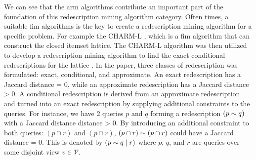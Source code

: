 We can see that the \acl{arm} algorithms contribute an important part of the foundation of this redescription mining algorithm category.
Often times, a suitable \ac{fim} algorithms is the key to create a redescription mining algorithm for a specific problem.
For example the CHARM-L \citep{zakihsiao2005}, which is a \ac{fim} algorithm that can construct the closed itemset lattice.
The CHARM-L algorithm was then utilized to develop a redescription mining algorithm to find the exact conditional redescriptions for the lattice .
In the paper, three classes of redescription was formulated: exact, conditional, and approximate.
An exact redescription has a Jaccard distance = 0, while an approximate redescription has a Jaccard distance > 0.
A conditional redescription is derived from an approximate redescription and turned into an exact redescription by supplying additional constraints to the queries.
For instance, we have 2 queries $p$ and $q$ forming a redescription $(p \sim q)$ with a Jaccard distance distance > 0.
By introducing an additional constraint to both queries: $(p \cap r)$ and $(p \cap r)$, $(p \cap r) \sim (p \cap r)$ could have a Jaccard distance = 0.
This is denoted by $(p \sim q \mid r)$ where $p$, $q$, and $r$ are queries over some disjoint view $v \in \mathcal{V}$.
